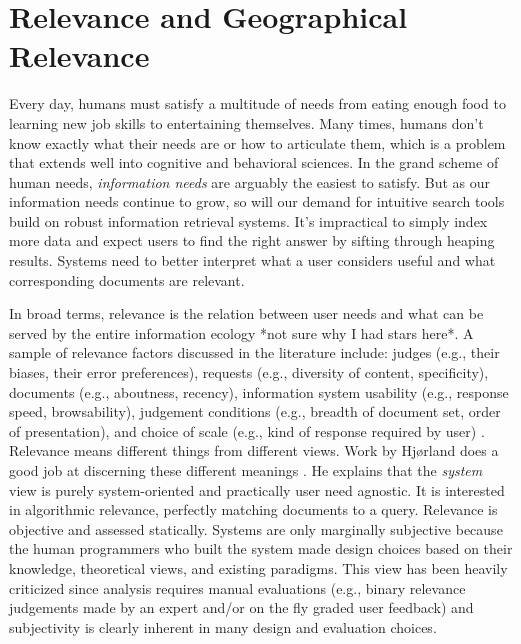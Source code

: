 \section{Relevance and Geographical Relevance}

Every day, humans must satisfy a multitude of needs from eating enough food to learning new job skills to entertaining themselves. Many times, humans don't know exactly what their needs are or how to articulate them, which is a problem that extends well into cognitive and behavioral sciences. In the grand scheme of human needs, \emph{information needs} are arguably the easiest to satisfy. But as our information needs continue to grow, so will our demand for intuitive search tools build on robust information retrieval systems. It's impractical to simply index more data and expect users to find the right answer by sifting through heaping results. Systems need to better interpret what a user considers useful and what corresponding documents are relevant.

In broad terms, relevance is the relation between user needs and what can be served by the entire information ecology \cite{Hjorland2010} *not sure why I had stars here*. A sample of relevance factors discussed in the literature include: judges (e.g., their biases, their error preferences), requests (e.g., diversity of content, specificity), documents (e.g., aboutness, recency), information system usability (e.g., response speed, browsability), judgement conditions (e.g., breadth of document set, order of presentation), and choice of scale (e.g., kind of response required by user) \cite{Schamber1994}. Relevance means different things from different views. Work by Hjørland does a good job at discerning these different meanings \cite{Hjorland2010}. He explains that the \emph{system} view is purely system-oriented and practically user need agnostic. It is interested in algorithmic relevance, perfectly matching documents to a query. Relevance is objective and assessed statically. Systems are only marginally subjective because the human programmers who built the system made design choices based on their knowledge, theoretical views, and existing paradigms. This view has been heavily criticized since analysis requires manual evaluations (e.g., binary relevance judgements made by an expert and/or on the fly graded user feedback) and subjectivity is clearly inherent in many design and evaluation choices.


